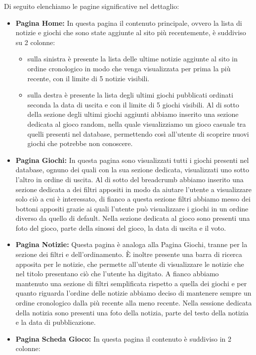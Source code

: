 Di seguito elenchiamo le pagine significative nel dettaglio:

\begin{itemize}
	\item \textbf{Pagina Home:} In questa pagina il contenuto principale, ovvero la lista di notizie e giochi che sono state aggiunte al sito più recentemente, è suddiviso su 2 colonne: 
	\begin{itemize}
		\item sulla sinistra è presente la lista delle ultime notizie aggiunte al sito in ordine cronologico in modo che venga visualizzata per prima la più recente, con il limite di 5 notizie visibili.
		\item sulla destra è presente la lista degli ultimi giochi pubblicati ordinati seconda la data di uscita e con il limite di 5 giochi visibili. Al di sotto della sezione degli ultimi giochi aggiunti abbiamo inserito una sezione dedicata al gioco random, nella quale visualizziamo un gioco casuale tra quelli presenti nel database, permettendo così all’utente di scoprire nuovi giochi che potrebbe non conoscere.
	\end{itemize}
	\item \textbf{Pagina Giochi:} In questa pagina sono visualizzati tutti i giochi presenti nel database, ognuno dei quali con la sua sezione dedicata, visualizzati uno sotto l’altro in ordine di uscita. Al di sotto del breadcrumb abbiamo inserito una sezione dedicata a dei filtri appositi in modo da aiutare l’utente a visualizzare solo ciò a cui è interessato, di fianco a questa sezione filtri abbiamo messo dei bottoni appositi grazie ai quali l’utente può visualizzare i giochi in un ordine diverso da quello di default. 
Nella sezione dedicata al gioco sono presenti una foto del gioco, parte della sinossi del gioco, la data di uscita e il voto.
	\item \textbf{Pagina Notizie:} Questa pagina è analoga alla Pagina Giochi, tranne per la sezione dei filtri e dell’ordinamento. È inoltre presente una barra di ricerca apposita per le notizie, che permette all’utente di visualizzare le notizie che nel titolo presentano ciò che l’utente ha digitato. A fianco abbiamo mantenuto una sezione di filtri semplificata rispetto a quella dei giochi e per quanto riguarda l’ordine delle notizie abbiamo deciso di mantenere sempre un ordine cronologico dalla più recente alla meno recente.
Nella sessione dedicata della notizia sono presenti una foto della notizia, parte del testo della notizia e la data di pubblicazione.
	\item \textbf{Pagina Scheda Gioco:} In questa pagina il contenuto è suddiviso in 2 colonne:

\end{itemize}
